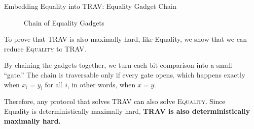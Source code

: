 \begin{block}{Embedding Equality into TRAV: Equality Gadget Chain}
\vspace{0.3em}

\begin{figure}[H]
\centering
{}
\caption{Chain of Equality Gadgets}
\end{figure}

To prove that \textsc{TRAV} is also maximally hard, like Equality,
we show that we can reduce \textsc{Equality} to \textsc{TRAV}.

By chaining the gadgets together, we turn each bit comparison into a small “gate.” 
The chain is traversable only if every gate opens, which happens exactly when 
$x_i = y_i$ for all $i$, in other words, when $x = y$.

Therefore, any protocol that solves \textsc{TRAV} can also solve \textsc{Equality}. 
Since Equality is deterministically maximally hard, 
\textbf{\textsc{TRAV} is also deterministically maximally hard.}

\end{block}